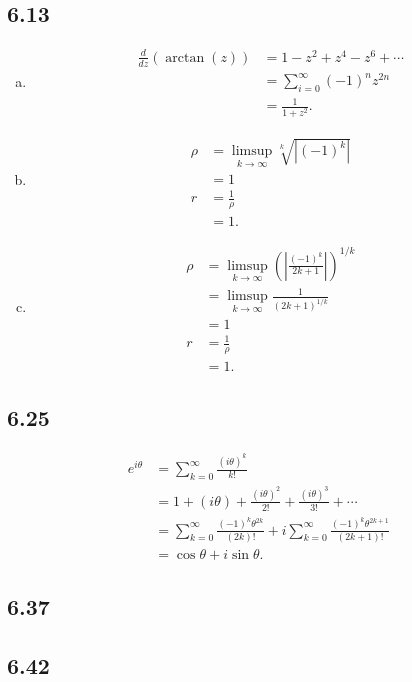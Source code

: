 \documentclass[10pt]{mypackage}
\begin{document}
\subsection{6.13}%
\begin{enumerate}[(a)]
  \item 
    \begin{align*}
      \frac{d}{dz}\left(\arctan(z)\right) &= 1 - z^2 + z^4 - z^6 + \cdots\\
                                          &= \sum_{i=0}^{\infty}(-1)^{n}z^{2n}\\
                                          &= \frac{1}{1+z^2}.
    \end{align*}
  \item 
    \begin{align*}
      \rho &= \limsup_{k\rightarrow\infty}\sqrt[k]{\left|\left(-1\right)^k\right|}\\
           &= 1\\
      r &= \frac{1}{\rho}\\
        &= 1.
    \end{align*}
  \item 
    \begin{align*}
      \rho &= \limsup_{k\rightarrow\infty}\left(\left|\frac{(-1)^k}{2k+1}\right|\right)^{1/k}\\
           &= \limsup_{k\rightarrow\infty}\frac{1}{\left(2k+1\right)^{1/k}}\\
           &= 1\\
      r &= \frac{1}{\rho}\\
        &= 1.
    \end{align*}
\end{enumerate}
\subsection{6.25}%
\begin{align*}
  e^{i\theta} &= \sum_{k=0}^{\infty}\frac{\left(i\theta\right)^{k}}{k!}\\
              &= 1 + \left(i\theta\right) + \frac{\left(i\theta\right)^2}{2!} + \frac{\left(i\theta\right)^3}{3!} + \cdots\\
              &= \sum_{k=0}^{\infty}\frac{(-1)^{k}\theta^{2k}}{\left(2k\right)!} + i\sum_{k=0}^{\infty}\frac{\left(-1\right)^{k}\theta^{2k+1}}{\left(2k+1\right)!}\\
              &= \cos\theta + i\sin\theta.
\end{align*}
\subsection{6.37}%
\subsection{6.42}%
\end{document}
